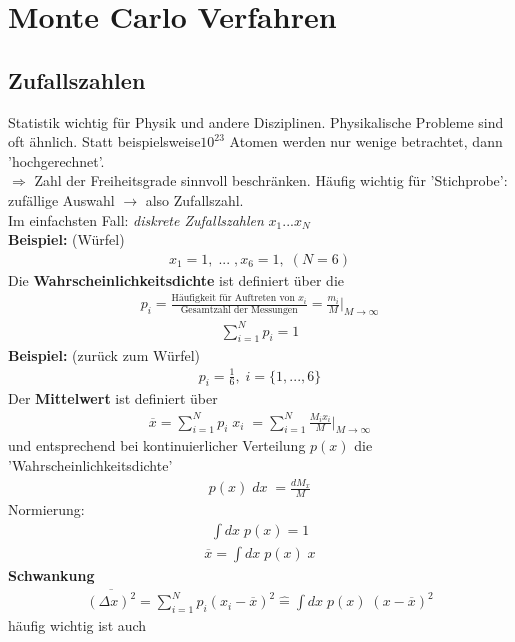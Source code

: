 \documentclass[12pt]{article}
\begin{document}
\section{Monte Carlo Verfahren}
\subsection{Zufallszahlen}
Statistik wichtig für Physik und andere Disziplinen. Physikalische Probleme sind oft ähnlich. Statt beispielsweise$10^{23}$ Atomen werden nur wenige betrachtet, dann 'hochgerechnet'.  \\
$\Rightarrow$ Zahl der Freiheitsgrade sinnvoll beschränken. Häufig wichtig für 'Stichprobe': zufällige Auswahl  $\to$ also Zufallszahl.\\
Im einfachsten Fall: \textit{diskrete Zufallszahlen} $x_1 ... x_N$\\
\textbf{Beispiel:} (Würfel)  \\
\begin{align*}
x_1 = 1 , \; ... \; ,  x_6 = 1 , \; (N=6)
\end{align*}
Die \textbf{Wahrscheinlichkeitsdichte} ist definiert über die
\begin{align}
p_i = \frac{\mbox{Häufigkeit für Auftreten von } x_i}{\mbox{Gesamtzahl der Messungen}} = \frac{m_i}{M} \biggr\vert_{M \to \infty}
\end{align}
\begin{align*}
\sum_{i=1}^N p_i = 1
\end{align*}
\textbf{Beispiel:} (zurück zum Würfel)
\begin{align*}
p_i = \frac{1}{6}, \; i=\{1,...,6\}
\end{align*}
Der \textbf{Mittelwert} ist definiert über
\begin{align}
\overline{x} = \sum_{i=1}^N p_i \; x_i \; = \sum_{i=1}^N \frac{M_i x_i}{M} \biggr\vert_{M \to \infty}
\end{align}
und entsprechend bei kontinuierlicher Verteilung $p(x)$ die 'Wahrscheinlichkeitsdichte'
\begin{align}
p(x) \; dx \; = \frac{dM_x}{M}
\end{align}
Normierung:
\begin{align}
\int dx \; p(x) = 1 
\end{align}
\begin{align}
\overline{x}= \int dx \; p(x) \; x
\end{align}
\textbf{Schwankung}
\begin{align}
\overline{(\Delta x)^2} = \sum_{i=1}^N p_i \left( x_i - \overline{x} \right) ^2 \widehat{=} \int dx \; p(x) \; (x- \overline{x})^2
\end{align}
häufig wichtig ist auch
\end{document}
